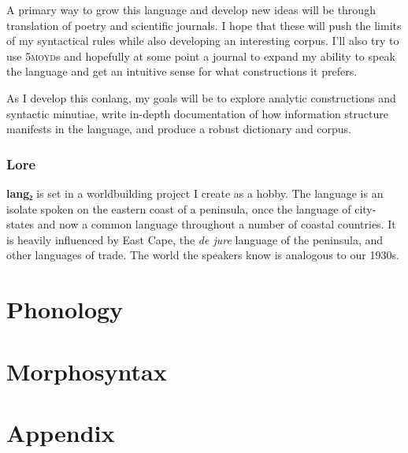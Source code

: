 \documentclass[fontsize=12pt,twoside=false,numbers=noenddot]{class/kaobook}
\newcommand{\langname}{\textbf{lang₂}}
\newcommand{\tsc}[1]{\textsc{#1}}
\begin{document}
A primary way to grow this language and develop new ideas will be through translation of poetry and scientific journals. I hope that these will push the limits of my syntactical rules while also developing an interesting corpus. I'll also try to use \tsc{5moyd}s and hopefully at some point a journal to expand my ability to speak the language and get an intuitive sense for what constructions it prefers.

As I develop this conlang, my goals will be to explore analytic constructions and syntactic minutiae, write in-depth documentation of how information structure manifests in the language, and produce a robust dictionary and corpus.

\section{Lore}
\langname{} is set in a worldbuilding project I create as a hobby. The language is an isolate spoken on the eastern coast of a peninsula, once the language of city-states and now a common language throughout a number of coastal countries. It is heavily influenced by East Cape, the \emph{de jure} language of the peninsula, and other languages of trade. The world the speakers know is analogous to our 1930s.

\mainmatter

 \part{Phonology} 



 \part{Morphosyntax} 









 \part{Appendix} 

\appendix





\backmatter
{}
\end{document}
